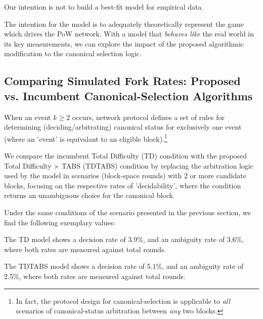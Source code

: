 \documentclass[11pt]{article}
\theoremstyle{plain}
\begin{document}
Our intention is not to build a best-fit model for empirical data.

The intention for the model is to adequately theoretically represent the game
which drives the PoW network. With a model that \emph{behaves like} the real
world in its key measurements, we can explore the impact of the proposed
algorithmic modification to the canonical selection logic.

\subsection{\normalsize{
    Comparing Simulated Fork Rates:
    Proposed vs. Incumbent Canonical-Selection Algorithms
}}

When an event $k \geq 2$ occurs, network protocol defines a set of rules for
determining (deciding/arbitrating) canonical status for exclusively one event
(where an 'event' is equivalant to an eligible block).\footnote{
  In fact, the protocol design for canonical-selection is applicable to \emph{all}
  scenarios of canonical-status arbitration between \emph{any} two blocks.
}

We compare the incumbent Total Difficulty (TD) condition with the proposed
Total Difficulty $\times$ TABS (TDTABS) condition by replacing the arbitration
logic used by the model in scenarios (block-space rounds) with $2$ or more
candidate blocks, focusing on the respective rates of 'decidability', where
the condition returns an unambiguous choice for the canonical block.

Under the same conditions of the scenario presented in the previous section,
we find the following exemplary values:




The TD model shows a decision rate of 3.9\%, and an ambiguity rate of 3.6\%,
where both rates are measured against total rounds.

The TDTABS model shows a decision rate of 5.1\%, and an ambiguity rate of 2.5\%,
where both rates are measured against total rounds.




\end{document}
